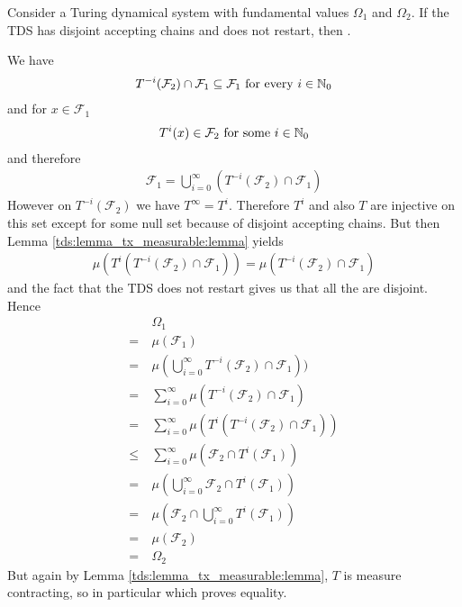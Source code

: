 \begin{Lemma}
	\label{tds:lemma_disj_acc_ch:lemma}
	Consider a Turing dynamical system with fundamental values $\Omega_1$ and $\Omega_2$.
	If the TDS has disjoint accepting chains and does not restart, then .
\end{Lemma}

\proof
	We have 
	\begin{align*}
		T^{-i}(\mathcal{F}_2) \cap \mathcal{F}_1 \subseteq \mathcal{F}_1 ~\text{for every}~ i \in \mathbb{N}_0
	\end{align*}
	and for $x \in \mathcal{F}_1$
	\begin{align*}
		T^i(x) \in \mathcal{F}_2 ~\text{for some}~ i \in \mathbb{N}_0
	\end{align*}
	and therefore
	\begin{align*}
		\mathcal{F}_1 = \bigcup_{i = 0}^\infty (T^{-i}(\mathcal{F}_2) \cap \mathcal{F}_1)
	\end{align*}
	However on $T^{-i}(\mathcal{F}_2)$ we have $T^\infty = T^i$. Therefore $T^i$ and also $T$ are injective on this set except for some null set because of disjoint accepting chains.
	But then Lemma \ref{tds:lemma_tx_measurable:lemma} yields
	\begin{align*}
		\mu(T^i(T^{-i}(\mathcal{F}_2) \cap \mathcal{F}_1)) = \mu(T^{-i}(\mathcal{F}_2) \cap \mathcal{F}_1)
	\end{align*}
	and the fact that the TDS does not restart gives us that all the  are disjoint.
	Hence
	\begin{align*}
		  &\Omega_1 \\
		=~&\mu(\mathcal{F}_1) \\
		=~&\mu(\bigcup_{i=0}^\infty T^{-i}(\mathcal{F}_2) \cap \mathcal{F}_1)) \\
		=~&\sum_{i=0}^\infty \mu(T^{-i}(\mathcal{F}_2) \cap \mathcal{F}_1) \\
		=~&\sum_{i=0}^\infty \mu(T^i(T^{-i}(\mathcal{F}_2) \cap \mathcal{F}_1)) \\
		\leq~&\sum_{i=0}^\infty \mu(\mathcal{F}_2 \cap T^i(\mathcal{F}_1)) \\
		=~&\mu(\bigcup_{i=0}^\infty \mathcal{F}_2 \cap T^i(\mathcal{F}_1)) \\
		=~&\mu(\mathcal{F}_2 \cap \bigcup_{i=0}^\infty T^i(\mathcal{F}_1)) \\
		=~&\mu(\mathcal{F}_2) \\
		=~&\Omega_2
	\end{align*}
	But again by Lemma \ref{tds:lemma_tx_measurable:lemma}, $T$ is measure contracting, so in particular  which proves equality.
\endproof